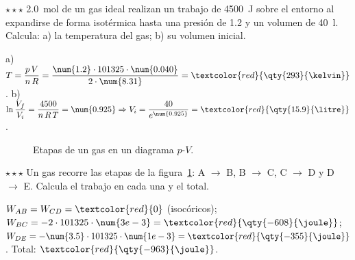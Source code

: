 \begin{exercise}
    \(\star\star\star\) \qty{2.0}{\mol} de un gas ideal realizan un trabajo de \qty{4500}{\joule} sobre el entorno al expandirse de
    forma isotérmica hasta una presión de \qty{1.2}{\atm} y un volumen de \qty{40}{\litre}. Calcula: a) la temperatura del gas; b) su
    volumen inicial.
    \begin{solu}
        a) \(T = \dfrac{p\,V}{n\,R} = \dfrac{\num{1.2} \cdot 101325 \cdot \num{0.040}}{2 \cdot \num{8.31}} = \textcolor{red}{\qty{293}{\kelvin}}\).
        b) \(\ln\dfrac{V_f}{V_i} = \dfrac{4500}{n\,R\,T} = \num{0.925} \Rightarrow V_i = \dfrac{40}{e^{\num{0.925}}} =
        \textcolor{red}{\qty{15.9}{\litre}}\).
    \end{solu}
\end{exercise}

\begin{figure}[H]
    \centering
    \caption{Etapas de un gas en un diagrama \(p\)-\(V\).}
    \label{fig:ud13-amp-etapas}
\end{figure}

\begin{exercise}
    \(\star\star\star\) Un gas recorre las etapas de la figura~\ref{fig:ud13-amp-etapas}: A \(\rightarrow\) B, B \(\rightarrow\) C,
    C \(\rightarrow\) D y D \(\rightarrow\) E. Calcula el trabajo en cada una y el total.
    \begin{solu}
        \(W_{AB} = W_{CD} = \textcolor{red}{0}\) (isocóricos); \(W_{BC} = -2 \cdot 101325 \cdot \num{3e-3} = \textcolor{red}{\qty{-608}{\joule}}\);
        \(W_{DE} = -\num{3.5} \cdot 101325 \cdot \num{1e-3} = \textcolor{red}{\qty{-355}{\joule}}\). Total: \(\textcolor{red}{\qty{-963}{\joule}}\).
    \end{solu}
\end{exercise}

